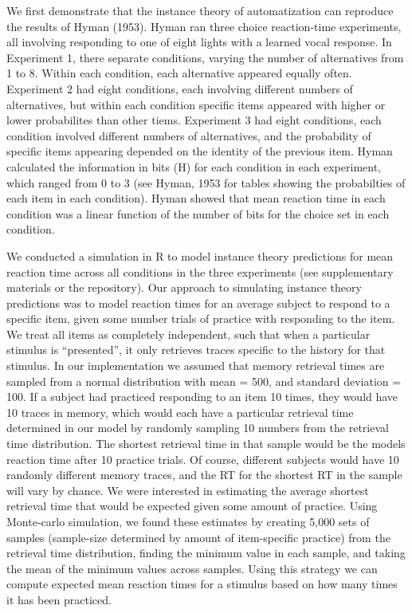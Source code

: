 \documentclass[,man,floatsintext]{apa6}
\begin{document}
We first demonstrate that the instance theory of automatization can reproduce the results of Hyman (1953). Hyman ran three choice reaction-time experiments, all involving responding to one of eight lights with a learned vocal response. In Experiment 1, there separate conditions, varying the number of alternatives from 1 to 8. Within each condition, each alternative appeared equally often. Experiment 2 had eight conditions, each involving different numbers of alternatives, but within each condition specific items appeared with higher or lower probabilites than other tiems. Experiment 3 had eight conditions, each condition involved different numbers of alternatives, and the probability of specific items appearing depended on the identity of the previous item. Hyman calculated the information in bits (H) for each condition in each experiment, which ranged from 0 to 3 (see Hyman, 1953 for tables showing the probabilties of each item in each condition). Hyman showed that mean reaction time in each condition was a linear function of the number of bits for the choice set in each condition.

We conducted a simulation in R to model instance theory predictions for mean reaction time across all conditions in the three experiments (see supplementary materials or the repository). Our approach to simulating instance theory predictions was to model reaction times for an average subject to respond to a specific item, given some number trials of practice with responding to the item. We treat all items as completely independent, such that when a particular stimulus is \enquote{presented}, it only retrieves traces specific to the history for that stimulus. In our implementation we assumed that memory retrieval times are sampled from a normal distribution with mean = 500, and standard deviation = 100. If a subject had practiced responding to an item 10 times, they would have 10 traces in memory, which would each have a particular retrieval time determined in our model by randomly sampling 10 numbers from the retrieval time distribution. The shortest retrieval time in that sample would be the models reaction time after 10 practice trials. Of course, different subjects would have 10 randomly different memory traces, and the RT for the shortest RT in the sample will vary by chance. We were interested in estimating the average shortest retrieval time that would be expected given some amount of practice. Using Monte-carlo simulation, we found these estimates by creating 5,000 sets of samples (sample-size determined by amount of item-specific practice) from the retrieval time distribution, finding the minimum value in each sample, and taking the mean of the minimum values across samples. Using this strategy we can compute expected mean reaction times for a stimulus based on how many times it has been practiced.
\end{document}
